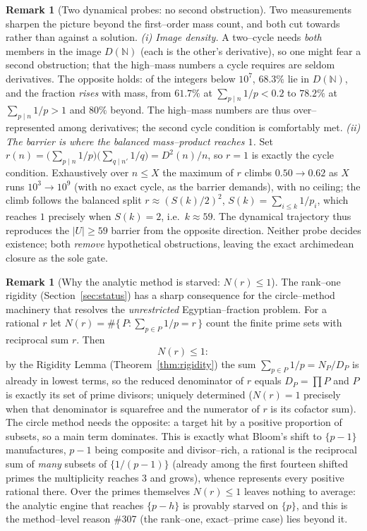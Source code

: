 \documentclass[11pt]{article}
\theoremstyle{definition}
\newtheorem{remark}[theorem]{Remark}
\begin{document}
\begin{remark}[Two dynamical probes: no second obstruction]\label{rem:dynamical}
Two measurements sharpen the picture beyond the first--order mass count, and both cut towards rather
than against a solution. \emph{(i) Image density.} A two--cycle needs \emph{both} members in the image
$D(\mathbb{N})$ (each is the other's derivative), so one might fear a second obstruction; that the
high--mass numbers a cycle requires are seldom derivatives. The opposite holds: of the integers below
$10^7$, $68.3\%$ lie in $D(\mathbb{N})$, and the fraction \emph{rises} with mass, from $61.7\%$ at
$\sum_{p\mid n}1/p<0.2$ to $78.2\%$ at $\sum_{p\mid n}1/p>1$ and $80\%$ beyond. The high--mass numbers
are thus over--represented among derivatives; the second cycle condition is comfortably met.
\emph{(ii) The barrier is where the balanced mass--product reaches $1$.} Set
$r(n)=\bigl(\sum_{p\mid n}1/p\bigr)\bigl(\sum_{q\mid n'}1/q\bigr)=D^2(n)/n$, so $r=1$ is exactly the
cycle condition. Exhaustively over $n\le X$ the maximum of $r$ climbs $0.50\to0.62$ as $X$ runs
$10^3\to10^9$ (with no exact cycle, as the barrier demands), with no ceiling; the climb follows the
balanced split $r\approx(S(k)/2)^2$, $S(k)=\sum_{i\le k}1/p_i$, which reaches $1$ precisely when
$S(k)=2$, i.e.\ $k\approx59$. The dynamical trajectory thus reproduces the $|U|\ge59$ barrier from the
opposite direction. Neither probe decides existence; both \emph{remove} hypothetical obstructions,
leaving the exact archimedean closure as the sole gate.
\end{remark}

\begin{remark}[Why the analytic method is starved: $N(r)\le1$]\label{rem:nostructure}
The rank--one rigidity (Section~\ref{sec:status}) has a sharp consequence for the circle--method
machinery that resolves the \emph{unrestricted} Egyptian--fraction problem. For a rational $r$ let
$N(r)=\#\{\,P:\sum_{p\in P}1/p=r\,\}$ count the finite prime sets with reciprocal sum $r$. Then
\[N(r)\le1:\]
by the Rigidity Lemma (Theorem~\ref{thm:rigidity}) the sum $\sum_{p\in P}1/p=N_P/D_P$ is already in
lowest terms, so the reduced denominator of $r$ equals $D_P=\prod P$ and $P$ is exactly its set of
prime divisors; uniquely determined ($N(r)=1$ precisely when that denominator is squarefree and the
numerator of $r$ is its cofactor sum). The circle method needs the opposite: a target hit by a positive
proportion of subsets, so a main term dominates. This is exactly what Bloom's shift to $\{p-1\}$
manufactures, $p-1$ being composite and divisor--rich, a rational is the reciprocal sum of
\emph{many} subsets of $\{1/(p-1)\}$ (already among the first fourteen shifted primes the multiplicity
reaches $3$ and grows), whence \cite{BloomShifted} represents every positive rational there. Over the
primes themselves $N(r)\le1$ leaves nothing to average: the analytic engine that reaches $\{p-h\}$ is
provably starved on $\{p\}$, and this is the method--level reason \#307 (the rank--one, exact--prime
case) lies beyond it.
\end{remark}
\end{document}
